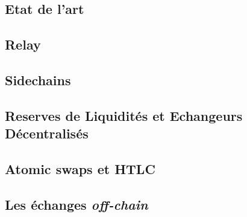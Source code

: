 \subsection{Etat de l'art}


\subsection[Relay]{Relay}


\subsection[Sidechains]{Sidechains}


\subsection[Réserves de Liquidités et Echangeurs Décentralisés]{Reserves de Liquidités et Echangeurs Décentralisés}


\subsection[Atomic swaps et HTLC]{Atomic swaps et HTLC}


\subsection[Échanges "off-chain"]{Les échanges \textit{off-chain}}
